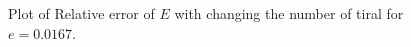 \documentclass[10pt]{article}
\begin{document}
\begin{figure}[hbt]
  \centering
    \caption{ \label{fig:5} Plot of Relative error of $E$ with changing the number of tiral for $e = 0.0167$.}
\end{figure}
\end{document}
